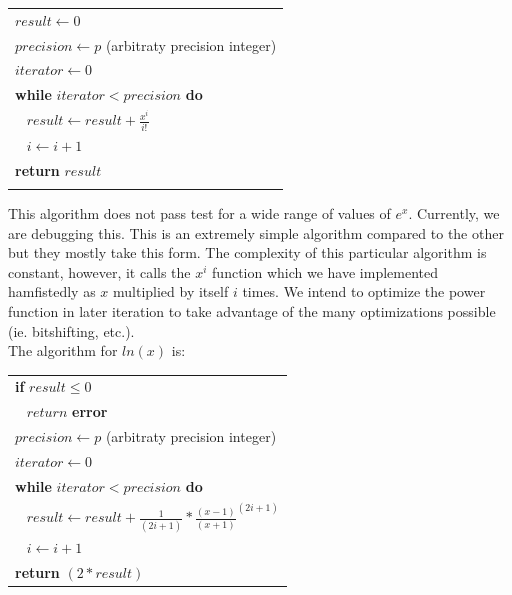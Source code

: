 \documentclass[a4paper]{article}
\begin{document}
\begin{center}
\begin{tabular}{l}
$result\leftarrow 0$ \\

$precision\leftarrow p$ (arbitraty precision integer) \\

\medskip
$iterator\leftarrow 0$ \\

\textbf{while} $iterator < precision$ \textbf{do} \\

$\;\;\;result\leftarrow result + \frac{x^i}{i!}$ \\

\medskip
$\;\;\;i\leftarrow i + 1$ \\

\textbf{return} $result$ \\ \\

\end{tabular}
\end{center}

This algorithm does not pass test for a wide range of values of $e^x$. Currently, we are debugging this. This is an extremely simple algorithm compared to the other but they mostly take this form. The complexity of this particular algorithm is constant, however, it calls the $x^i$ function which we have implemented hamfistedly as $x$ multiplied by itself $i$ times. We intend to optimize the power function in later iteration to take advantage of the many optimizations possible (ie. bitshifting, etc.). \\

The algorithm for $ln(x)$ is:

\begin{center}
\begin{tabular}{l}
{\textbf{if}} $result\leq 0$ \\
$\;\;\; return$ {\textbf{error}} \medskip \\ 

$precision\leftarrow p$ (arbitraty precision integer) \\

\medskip
$iterator\leftarrow 0$ \\

\textbf{while} $iterator < precision$ \textbf{do} \\

$\;\;\;result\leftarrow result + \frac{1}{(2i+1)} * \frac{(x-1)}{(x+1)}^{(2i+1)}$ \\

\medskip
$\;\;\;i\leftarrow i + 1$ \\

\textbf{return} $(2*result)$

\end{tabular}
\end{center}
\end{document}
